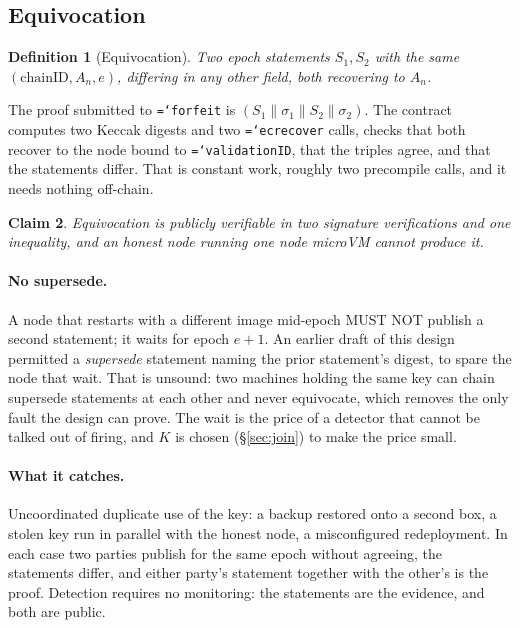 \documentclass[11pt,a4paper]{article}
\newtheorem{definition}{Definition}[section]
\newtheorem{claim}[definition]{Claim}
\newcommand{\code}[1]{\texttt{\hyphenchar\font=`\-\relax #1}}
\begin{document}
\subsection{Equivocation}
\label{sec:equiv}

\begin{definition}[Equivocation]
Two epoch statements $S_1, S_2$ with the same $(\text{chainID}, A_n, e)$,
differing in any other field, both recovering to $A_n$.
\end{definition}

The proof submitted to \code{forfeit} is $(S_1 \| \sigma_1 \| S_2 \| \sigma_2)$.
The contract computes two Keccak digests and two \code{ecrecover} calls, checks
that both recover to the node bound to \code{validationID}, that the triples
agree, and that the statements differ. That is constant work, roughly two
precompile calls, and it needs nothing off-chain.

\begin{claim}
Equivocation is publicly verifiable in two signature verifications and one
inequality, and an honest node running one node microVM cannot produce it.
\end{claim}

\paragraph{No supersede.} A node that restarts with a different image mid-epoch
MUST NOT publish a second statement; it waits for epoch $e+1$. An earlier draft of
this design permitted a \emph{supersede} statement naming the prior statement's
digest, to spare the node that wait. That is unsound: two machines holding the
same key can chain supersede statements at each other and never equivocate, which
removes the only fault the design can prove. The wait is the price of a detector
that cannot be talked out of firing, and $K$ is chosen (\S\ref{sec:join}) to make
the price small.

\paragraph{What it catches.} Uncoordinated duplicate use of the key: a backup
restored onto a second box, a stolen key run in parallel with the honest node, a
misconfigured redeployment. In each case two parties publish for the same epoch
without agreeing, the statements differ, and either party's statement together with
the other's is the proof. Detection requires no monitoring: the statements are the
evidence, and both are public.
\end{document}
